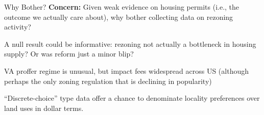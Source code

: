 \documentclass[10pt]{beamer}
\begin{document}
\begin{frame}{Why Bother?}
\textbf{Concern:} Given weak evidence on housing permits (i.e., the outcome we actually care about), why bother collecting data on rezoning activity?
\vspace{2em}

A null result could be informative: rezoning not actually a bottleneck in housing supply? Or was reform just a minor blip?

\vspace{2em}
VA proffer regime is unusual, but impact fees widespread across US (although perhaps the only zoning regulation that is declining in popularity)

\vspace{2em}
``Discrete-choice'' type data offer a chance to denominate locality preferences over land uses in dollar terms.

\end{frame}
\end{document}
